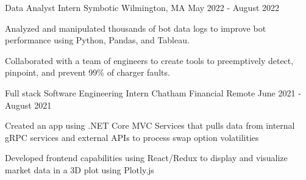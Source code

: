 \begin{cventries}
\cventry
    {Data Analyst Intern} %
    {Symbotic} %
    {Wilmington, MA} %
    {May 2022 - August 2022} %
    {
      \begin{cvitems} %
        \item {Analyzed and manipulated thousands of bot data logs to improve bot performance using Python, Pandas, and Tableau.}
        \item {Collaborated with a team of engineers to create tools to preemptively detect, pinpoint, and prevent 99\% of charger faults.}
      \end{cvitems}
    }

  \cventry
    {Full stack Software Engineering Intern} %
    {Chatham Financial} %
    {Remote} %
    {June 2021 - August 2021} %
    {
      \begin{cvitems} %
        \item {Created an app using .NET Core MVC Services that pulls data from internal gRPC services and external APIs to process swap option volatilities}
        \item {Developed frontend capabilities using React/Redux to display and visualize market data in a 3D plot using Plotly.js}
      \end{cvitems}
    }

\end{cventries}
